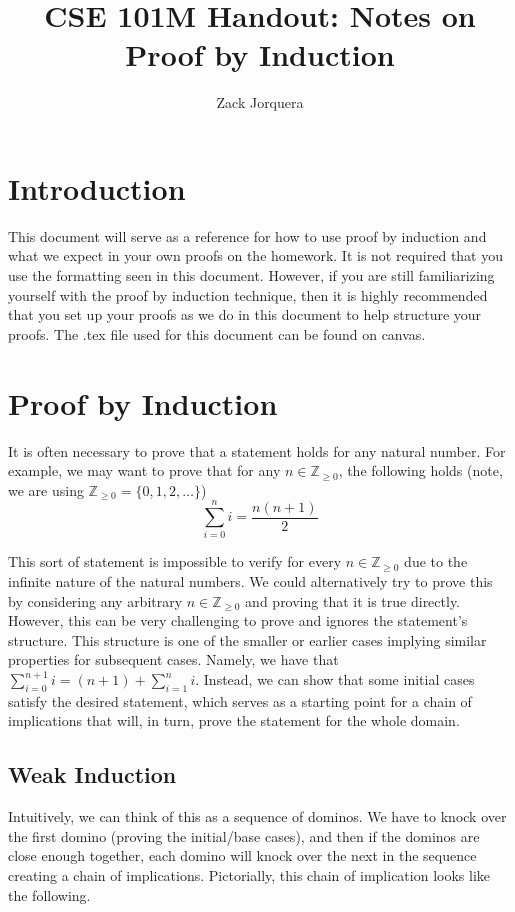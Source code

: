 \documentclass{article}
\title{CSE 101M Handout: Notes on Proof by Induction}
\author{Zack Jorquera}
\date{}
\newcommand{\ZZ}{\mathbb{Z}_{\geq 0}}
\theoremstyle{plain}
\theoremstyle{definition}
\begin{document}
\maketitle

\section{Introduction}

This document will serve as a reference for how to use proof by induction and what we expect in your own proofs on the homework. It is not required that you use the formatting seen in this document. However, if you are still familiarizing yourself with the proof by induction technique, then it is highly recommended that you set up your proofs as we do in this document to help structure your proofs. The .tex file used for this document can be found on canvas.

\section{Proof by Induction}

It is often necessary to prove that a statement holds for any natural number. For example, we may want to prove that for any \(n \in \ZZ\), the following holds (note, we are using \(\ZZ = \{0, 1, 2, \dotsc\}\))
\[\sum_{i=0}^n i = \frac{n(n+1)}{2}\]

This sort of statement is impossible to verify for every \(n \in \ZZ\) due to the infinite nature of the natural numbers. We could alternatively try to prove this by considering any arbitrary \(n \in \ZZ\) and proving that it is true directly. However, this can be very challenging to prove and ignores the statement's structure. This structure is one of the smaller or earlier cases implying similar properties for subsequent cases. Namely, we have that \(\sum_{i=0}^{n+1} i = (n+1) + \sum_{i=1}^n i\). Instead, we can show that some initial cases satisfy the desired statement, which serves as a starting point for a chain of implications that will, in turn, prove the statement for the whole domain.

\subsection{Weak Induction}

Intuitively, we can think of this as a sequence of dominos. We have to knock over the first domino (proving the initial/base cases), and then if the dominos are close enough together, each domino will knock over the next in the sequence creating a chain of implications.
Pictorially, this chain of implication looks like the following.
\end{document}
